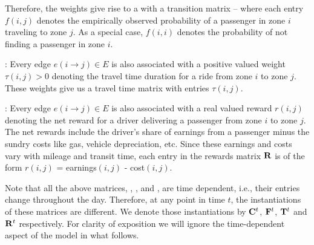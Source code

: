 Therefore, the weights give rise to a {\markovchain} with a transition matrix {\empiricaltransitionmatrix} -- 
where each entry $f(i,j)$ 
denotes the empirically observed probability of a passenger in zone $i$
traveling to zone $j$. 
As a special case, 
$f(i,i)$ denotes the probability of not finding a passenger in zone $i$. 


:
Every edge $e(i\rightarrow j) \in E$ is also associated with a positive valued weight $\tau(i,j) > 0$ 
denoting the travel time duration for a ride from zone $i$ to zone $j$. 
These weights give us a travel time matrix {\traveltimematrix} with entries $\tau(i,j)$. 


:
Every edge $e(i \rightarrow j) \in E$ is also associated with a real valued reward $r(i,j)$ denoting
the net reward for a driver delivering a passenger from zone $i$ to zone $j$. The net rewards include the driver's
share of earnings from a passenger minus the sundry costs like gas, vehicle depreciation, etc.  Since these
earnings and costs vary with mileage and transit time, each entry in the rewards matrix ${\mathbf{R}}$ 
is of the form $r(i,j)$ = earnings$(i,j)$ - cost$(i,j)$.

Note that all the above matrices, {\countmatrix}, {\empiricaltransitionmatrix}, {\traveltimematrix} and {\rewardsmatrix}, are time dependent, i.e., their entries change throughout the day. Therefore, at any point in time $t$, the instantiations of these matrices
are different. We denote those instantiations by ${\mathbf{C}}^t$, ${\mathbf{F}}^t$, ${\mathbf{T}}^t$ and ${\mathbf{R}}^t$ respectively.
For clarity of exposition we will ignore the time-dependent aspect of the model in what follows.


